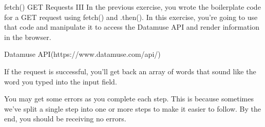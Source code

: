 fetch() GET Requests III
    In the previous exercise, you wrote the boilerplate code for a GET request using fetch() and .then(). In this exercise, you’re going to use that code and manipulate it to access the Datamuse API and render information in the browser.

        Datamuse API(https://www.datamuse.com/api/)
        
    If the request is successful, you’ll get back an array of words that sound like the word you typed into the input field.

    You may get some errors as you complete each step. This is because sometimes we’ve split a single step into one or more steps to make it easier to follow. By the end, you should be receiving no errors.